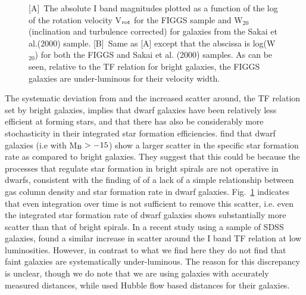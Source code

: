 \documentclass[useAMS,usenatbib]{mn2e}
\begin{document}
\begin{figure}
\caption{[A]~The absolute I band magnitudes plotted as a function of the log of the rotation velocity V$_{\rm rot}$ for the FIGGS sample and W$_{20}$ (inclination and turbulence corrected) for galaxies from  the Sakai et al.(2000) sample. [B]~Same as [A] except that the abscissa is log(W$_{20}$) for both the FIGGS and Sakai et al. (2000)
samples. As can be seen, relative to the TF relation for bright galaxies, the FIGGS galaxies are under-luminous for their velocity width.
}
\label{fig:itf}
\end{figure}


The systematic deviation from and the increased scatter around, the TF relation set by bright galaxies, implies that dwarf galaxies have been relatively less efficient at forming stars, and that there has also be considerably more stochasticity in their integrated star formation efficiencies. \cite{lee07} find that dwarf galaxies (i.e with M$_{\rm B} > -15$) show a larger scatter in the specific star formation rate as compared to bright galaxies. They suggest that this could be because the processes that regulate star formation in bright spirals are not operative in dwarfs, consistent with the finding of \cite{bc06} of a lack of a simple relationship between gas column density and star formation rate in dwarf galaxies. Fig.~\ref{fig:itf} indicates that even integration over time is not sufficient to remove this scatter, i.e. even the integrated star formation rate of dwarf galaxies shows substantially more scatter than that of bright spirals. In a recent study using a sample of SDSS galaxies, \cite{geha06} found a similar increase in scatter around the I band TF relation at low luminosities. However, in contrast to what we find here they do not find that faint galaxies are systematically under-luminous. The reason for this discrepancy is unclear, though we do note that we are using galaxies with accurately measured distances, while \cite{geha06} used Hubble flow based distances for their galaxies. 
\end{document}
